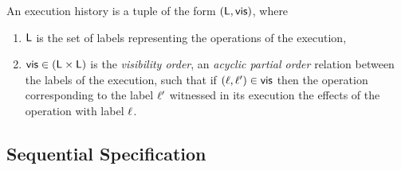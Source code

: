 \begin{definition}[histories]
  \label{definition:histories} An execution history is a tuple of the form
  $(\mathsf{L}, \mathsf{vis})$, where
  \begin{enumerate}
  \item $\mathsf{L}$ is the set of labels representing the operations of
    the execution,
  \item $\mathsf{vis} \in (\mathsf{L} \times \mathsf{L})$ is the
    \emph{visibility order}, an \emph{acyclic partial order}
    relation between the labels of the execution, such that if $(\ell,
    \ell') \in \mathsf{vis}$ then the operation corresponding to the label
    $\ell'$ witnessed in its execution the effects of the operation
    with label $\ell$.
  \end{enumerate}
\end{definition}


\subsection{Sequential Specification}
\label{subsec:sequential specification}


